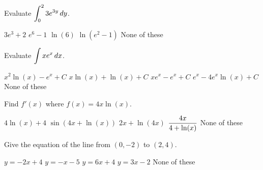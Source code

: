 \documentclass[12pt]{exam}
\newcommand{\ds}{\ensuremath{\displaystyle}}
\begin{document}
\begin{questions}
\vfill

\question[5]
Evaluate $\ds\int_{0}^{2} 3e^{3y}\,dy$.

\begin{checkboxes}
\choice $3e^3+2$
\CorrectChoice $e^6-1$
\choice $\ln(6)$
\choice $\ln(e^2-1)$
\choice None of these
\end{checkboxes}

\vfill

\newpage

\question[5]
Evaluate $\ds\int xe^x \,dx$.

\begin{checkboxes}
\choice $x^2\ln(x)-e^x+C$
\choice $x\ln(x)+\ln(x)+C$
\CorrectChoice $xe^x-e^x+C$
\choice $e^x - 4e^x\ln(x)+C$
\choice None of these
\end{checkboxes}

\vfill

\question[5]
Find $f'(x)$ where $f(x)=4x\ln(x)$.

\begin{checkboxes}
\CorrectChoice $4\ln(x)+4$
\choice $\sin(4x+\ln(x))$
\choice $2x+\ln(4x)$
\choice $\ds\frac{4x}{4+\ln(x)}$
\choice None of these
\end{checkboxes}

\vfill

\question[5]
Give the equation of the line from $(0,-2)$ to $(2,4)$.

\begin{checkboxes}
\choice $y=-2x+4$
\choice $y=-x-5$
\choice $y=6x+4$
\CorrectChoice $y=3x-2$
\choice None of these
\end{checkboxes}

\vfill

\end{questions}
\end{document}
